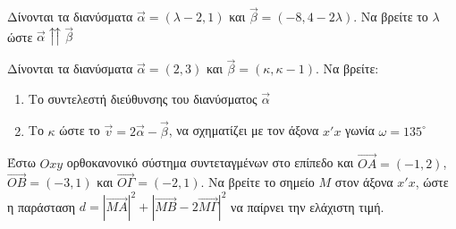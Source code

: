 \documentclass{../../presentation}
\begin{document}
\begin{askisi}
  Δίνονται τα διανύσματα $\vec{α}=(λ-2,1)$ και $\vec{β}=(-8,4-2λ)$. Να βρείτε το $λ$ ώστε $\vec{α}\upuparrows \vec{β}$

\end{askisi}

\begin{askisi}
  Δίνονται τα διανύσματα $\vec{α}=(2,3)$ και $\vec{β}=(κ,κ-1)$. Να βρείτε:
  \begin{enumerate}
    \item<1-> Το συντελεστή διεύθυνσης του διανύσματος $\vec{α}$
    \item<2-> Το $κ$ ώστε το $\vec{v}=2\vec{α}-\vec{β}$, να σχηματίζει με τον άξονα $x'x$ γωνία $ω=135^{\circ}$
  \end{enumerate}

\end{askisi}

\begin{askisi}
  Έστω $Οxy$ ορθοκανονικό σύστημα συντεταγμένων στο επίπεδο και $\overrightarrow{ΟΑ}=(-1,2)$, $\overrightarrow{ΟΒ}=(-3,1)$ και $\overrightarrow{ΟΓ}=(-2,1)$. Να βρείτε το σημείο $Μ$ στον άξονα $x'x$, ώστε η παράσταση $d=|\overrightarrow{ΜΑ}|^2+|\overrightarrow{ΜΒ}-2\overrightarrow{ΜΓ}|^2$ να παίρνει την ελάχιστη τιμή.

\end{askisi}
\end{document}
